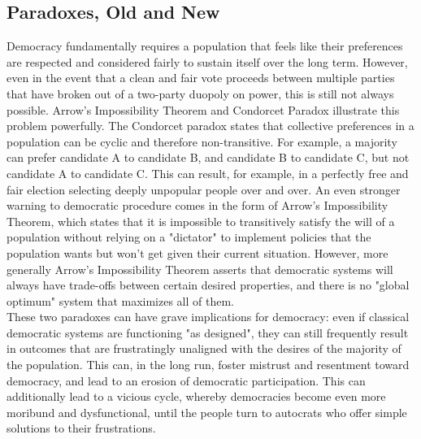 \documentclass[a4paper]{article}
\begin{document}
\subsection{Paradoxes, Old and New}
Democracy fundamentally requires a population that feels like their preferences are respected and considered fairly to sustain itself over the long term. However, even in the event that a clean and fair vote proceeds between multiple parties that have broken out of a two-party duopoly on power, this is still not always possible. Arrow's Impossibility Theorem and Condorcet Paradox illustrate this problem powerfully.
The Condorcet paradox states that collective preferences in a population can be cyclic and therefore non-transitive. For example, a majority can prefer candidate A to candidate B, and candidate B to candidate C, but not candidate A to candidate C. This can result, for example, in a perfectly free and fair election selecting deeply unpopular people over and over. An even stronger warning to democratic procedure comes in the form of Arrow's Impossibility Theorem, which states that it is impossible to transitively satisfy the will of a population without relying on a "dictator" to implement policies that the population wants but won't get given their current situation. However, more generally Arrow's Impossibility Theorem asserts that democratic systems will always have trade-offs between certain desired properties, and there is no "global optimum" system that maximizes all of them.\\

These two paradoxes can have grave implications for democracy: even if classical democratic systems are functioning "as designed", they can still frequently result in outcomes that are frustratingly unaligned with the desires of the majority of the population. This can, in the long run, foster mistrust and resentment toward democracy, and lead to an erosion of democratic participation. This can additionally lead to a vicious cycle, whereby democracies become even more moribund and dysfunctional, until the people turn to autocrats who offer simple solutions to their frustrations.
\end{document}
